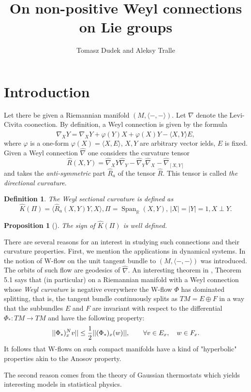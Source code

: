 \documentclass[12pt]{article}
\title{On non-positive Weyl connections on  Lie groups}
\author{Tomasz Dudek and Aleksy Tralle}
\newtheorem{proposition}{Proposition}
\newtheorem{definition}{Definition}
\begin{document}
\maketitle{}


\section{Introduction}
Let there be given a Riemannian manifold $(M,\langle -,-\rangle)$. Let $\nabla$ denote the Levi-Civita coonection.
By definition, a Weyl connection is given by the formula
$$\hat\nabla_XY=\nabla_XY+\varphi(Y)X+\varphi(X)Y-\langle X,Y\rangle E,$$
where $\varphi$ is a one-form $\varphi(X)=\langle X,E\rangle$, $X,Y$ are arbitrary vector ields, $E$ is fixed.
Given a Weyl connection $\widehat{\nabla}$ one considers the curvature tensor
$$\widehat{R}(X,Y)=\widehat{\nabla}_XY\widehat{\nabla}_Y-\widehat{\nabla}_Y\widehat{\nabla}_X-\widehat{\nabla}_{[X,Y]}$$ 
and takes the {\it anti-symmetric} part $\widehat{R}_a$ of the tensor $\widehat{R}$. This tensor is called {\it the directional curvature}.
\begin{definition} The Weyl sectional curvature {\rm is defined as}
$$\widehat{K}(\Pi)=\langle \widehat{R}_a(X,Y)Y,X\rangle,\Pi=
\operatorname{Span}_{\mathbb{R}}(X,Y),\,|X|=|Y|=1, X\perp Y.$$
\end{definition}
\begin{proposition}[\cite{TW}] The sign of $\widehat{K}(\Pi)$ is well defined.
\end{proposition}
There are several reasons for an interest in studying such connections and their curvature properties. First, we mention the applications in dynamical systems. In \cite{W} the notion of W-flow on the unit tangent bundle to $(M,\langle -,-\rangle)$ was introduced. The orbits of such flow are geodesics of $\widehat{\nabla}$. An interesting theorem in \cite{W}, Theorem 5.1  says that (in particular) on a Riemannian manifold with a Weyl connection whose {\it Weyl curvature} is negative everywhere the W-flow $\Phi$ has dominated splitting, that is, the tangent bundle continuously splits as 
$TM=E\oplus F$ in a way that the subbundles $E$ and $F$ are invariant with respect to the differential $\Phi_*: TM\rightarrow TM$ and  have the following property: 
$$||\Phi_*)^N_xv||\leq {1\over 2}||(\Phi_*)_x(w)||,\qquad \forall v\in E_x, 
\quad w\in F_x.$$ 
It follows that W-flows on such compact  manifolds  have a kind of "hyperbolic" properties akin to the Anosov property. 

The second reason comes from the theory of Gaussian thermostats \cite{H} which yields interesting models in statistical physics.
\end{document}
